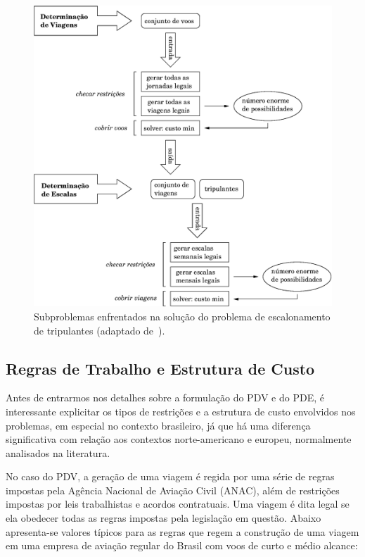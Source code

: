 \documentclass[12pt,a4paper]{article}
\begin{document}
\begin{figure}[htbp]
	\begin{center}
		\includegraphics[scale=0.6]{fig/escalonamento.eps}
		\caption{Subproblemas enfrentados na solução do problema de escalonamento de tripulantes 
		(adaptado de~\cite{souai09}).}
		\label{fig:escalonamento}
	\end{center}
\end{figure}

\subsection{Regras de Trabalho e Estrutura de Custo}
\label{sec:regras_e_custos}

Antes de entrarmos nos detalhes sobre a formulação do PDV e do PDE, é interessante explicitar os 
tipos de restrições e a estrutura de custo envolvidos nos problemas, em especial no contexto 
brasileiro, já que há uma diferença significativa com relação aos contextos norte-americano e 
europeu, normalmente analisados na literatura.

No caso do PDV, a geração de uma viagem é regida por uma série de regras impostas pela Agência
Nacional de Aviação Civil (ANAC), além de restrições impostas por leis trabalhistas e acordos
contratuais. Uma viagem é dita legal se ela obedecer todas as regras impostas pela legislação em
questão. Abaixo apresenta-se valores típicos para as regras que regem a construção de uma viagem em
uma empresa de aviação regular do Brasil com voos de curto e médio alcance:
\end{document}
